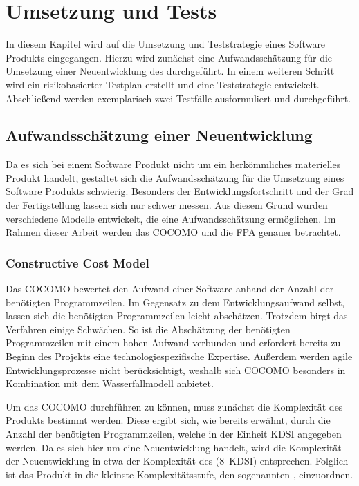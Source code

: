 \section{Umsetzung und Tests}
In diesem Kapitel wird auf die Umsetzung und Teststrategie eines Software Produkts eingegangen.
Hierzu wird zunächst eine Aufwandsschätzung für die Umsetzung einer Neuentwicklung des  durchgeführt.
In einem weiteren Schritt wird ein risikobasierter Testplan erstellt und eine Teststrategie entwickelt.
Abschließend werden exemplarisch zwei Testfälle ausformuliert und durchgeführt.

\subsection{Aufwandsschätzung einer Neuentwicklung}
Da es sich bei einem Software Produkt nicht um ein herkömmliches materielles Produkt handelt, gestaltet sich die Aufwandsschätzung für die Umsetzung eines Software Produkts schwierig.
Besonders der Entwicklungsfortschritt und der Grad der Fertigstellung lassen sich nur schwer messen.
Aus diesem Grund wurden verschiedene Modelle entwickelt, die eine Aufwandsschätzung ermöglichen.
Im Rahmen dieser Arbeit werden das \ac{COCOMO} und die \ac{FPA} genauer betrachtet.

\subsubsection{Constructive Cost Model}
Das \ac{COCOMO} bewertet den Aufwand einer Software anhand der Anzahl der benötigten Programmzeilen.
Im Gegensatz zu dem Entwicklungsaufwand selbst, lassen sich die benötigten Programmzeilen leicht abschätzen.
Trotzdem birgt das Verfahren einige Schwächen.
So ist die Abschätzung der benötigten Programmzeilen mit einem hohen Aufwand verbunden und erfordert bereits zu Beginn des Projekts eine technologiespezifische Expertise.
Außerdem werden agile Entwicklungsprozesse nicht berücksichtigt, weshalb sich \ac{COCOMO} besonders in Kombination mit dem Wasserfallmodell anbietet.

\noindent{}Um das \ac{COCOMO} durchführen zu können, muss zunächst die Komplexität des Produkts bestimmt werden.
Diese ergibt sich, wie bereits erwähnt, durch die Anzahl der benötigten Programmzeilen, welche in der Einheit \ac{KDSI} angegeben werden.
Da es sich hier um eine Neuentwicklung handelt, wird die Komplexität der Neuentwicklung in etwa der Komplexität des  (8~\ac{KDSI}) entsprechen.
Folglich ist das Produkt in die kleinste Komplexitätsstufe, den sogenannten , einzuordnen.

